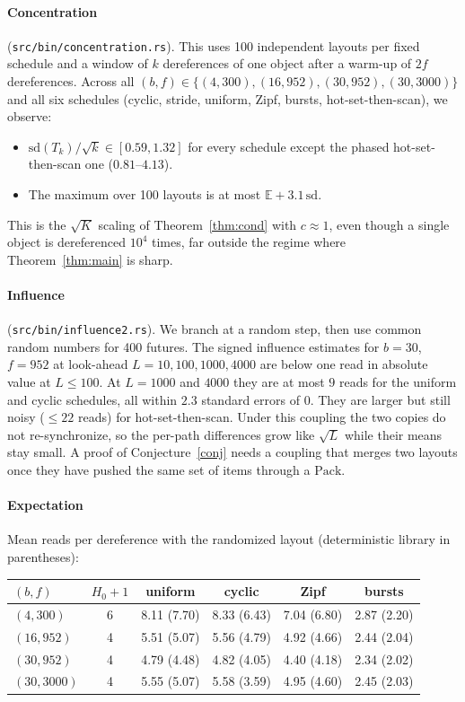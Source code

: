 \documentclass[11pt]{article}
\theoremstyle{definition}
\newcommand{\E}{\mathbb{E}}
\begin{document}
\paragraph{Concentration} (\texttt{src/bin/concentration.rs}). This uses 100
independent layouts per fixed schedule and a window of $k$ dereferences of one
object after a warm-up of $2f$ dereferences. Across all $(b,f)\in\{(4,300),(16,952),(30,952),(30,3000)\}$ and all six schedules (cyclic,
stride, uniform, Zipf, bursts, hot-set-then-scan), we observe:
\begin{itemize}
\item $\mathrm{sd}(T_k)/\sqrt k\in[0.59,1.32]$ for every schedule except the phased hot-set-then-scan one ($0.81$--$4.13$).
\item The maximum over 100 layouts is at most $\E+3.1\,\mathrm{sd}$.
\end{itemize}
This is the $\sqrt K$ scaling of Theorem~\ref{thm:cond} with $c\approx 1$, even
though a single object is dereferenced $10^4$ times, far outside the regime
where Theorem~\ref{thm:main} is sharp.

\paragraph{Influence} (\texttt{src/bin/influence2.rs}). We branch at a random
step, then use common random numbers for 400 futures. The signed influence
estimates for $b=30$, $f=952$ at look-ahead $L=10,100,1000,4000$ are
below one read in absolute value at $L\le 100$. At $L=1000$ and $4000$ they
are at most $9$ reads for the uniform and cyclic schedules, all within
$2.3$ standard errors of $0$. They are larger but still noisy ($\le 22$
reads) for hot-set-then-scan. Under this coupling the two copies do not
re-synchronize, so the per-path differences grow like $\sqrt L$ while their
means stay small. A proof of Conjecture~\ref{conj} needs a coupling that
merges two layouts once they have pushed the same set of items through a
$\mathrm{Pack}$.

\paragraph{Expectation} Mean reads per dereference with the randomized layout
(deterministic library in parentheses):

\medskip
\begin{tabular}{lccccc}
\toprule
$(b,f)$ & $H_0+1$ & uniform & cyclic & Zipf & bursts\\
\midrule
$(4,300)$ & 6 & 8.11 (7.70) & 8.33 (6.43) & 7.04 (6.80) & 2.87 (2.20)\\
$(16,952)$ & 4 & 5.51 (5.07) & 5.56 (4.79) & 4.92 (4.66) & 2.44 (2.04)\\
$(30,952)$ & 4 & 4.79 (4.48) & 4.82 (4.05) & 4.40 (4.18) & 2.34 (2.02)\\
$(30,3000)$ & 4 & 5.55 (5.07) & 5.58 (3.59) & 4.95 (4.60) & 2.45 (2.03)\\
\bottomrule
\end{tabular}
\medskip
\end{document}
